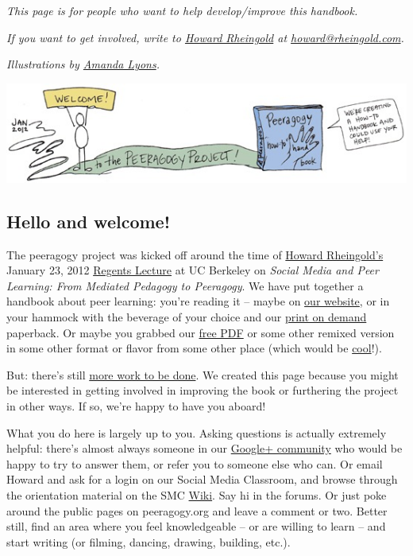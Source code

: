 \emph{This page is for people who want to help develop/improve this
handbook.}

\emph{If you want to get involved, write to
\href{http://en.wikipedia.org/wiki/Howard\_Rheingold}{Howard Rheingold}
at \href{mailto:howard@rheingold.com}{howard@rheingold.com}.}

\emph{Illustrations by \href{http://www.visualsforchange.com/}{Amanda
Lyons}.}

\begin{center}
\includegraphics[width=.9\textwidth]{../pictures/welcome_color.jpg}
\end{center}

\subsection{Hello and welcome!}

The peeragogy project was kicked off around the time of
\href{http://rheingold.com/}{Howard Rheingold's} January 23, 2012
\href{http://vimeo.com/35685124}{Regents Lecture} at UC Berkeley on
\emph{Social Media and Peer Learning: From Mediated Pedagogy to
Peeragogy}. We have put together a handbook about peer learning: you're
reading it -- maybe on \href{peeragogy.org}{our website}, or in your
hammock with the beverage of your choice and our
\href{http://www.lulu.com/shop/howard-rheingold-and-peeragogyorg-editors/the-peeragogy-handbook/paperback/product-20607425.html}{print
on demand} paperback. Or maybe you grabbed our
\href{http://peeragogy.net/peeragogy-handbook-v1-1.pdf}{free PDF} or
some other remixed version in some other format or flavor from some
other place (which would be
\href{http://peeragogy.org/resources/license/}{cool}!).

But: there's still
\href{http://peeragogy.org/peeragogy-org-roadmap/}{more work to be
done}. We created this page because you might be interested in getting
involved in improving the book or furthering the project in other ways.
If so, we're happy to have you aboard!

What you do here is largely up to you. Asking questions is actually
extremely helpful: there's almost always someone in our
\href{https://plus.google.com/u/0/communities/107386162349686249470}{Google+
community} who would be happy to try to answer them, or refer you to
someone else who can. Or email Howard and ask for a login on our Social
Media Classroom, and browse through the orientation material on the SMC
\href{http://socialmediaclassroom.com/host/peeragogy}{Wiki}. Say hi in
the forums. Or just poke around the public pages on peeragogy.org and
leave a comment or two. Better still, find an area where you feel
knowledgeable -- or are willing to learn -- and start writing (or
filming, dancing, drawing, building, etc.).


